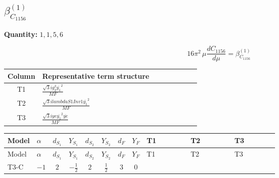 \documentclass[8pt]{article}
\begin{document}
\begin{landscape}
\section*{$\beta_{C_{1156}}^{(1)}$}
\noindent\textbf{Quantity: }$\mathrm{1,1,5,6}$\par\smallskip
\[16\pi^2\,\mu\frac{d C_{1156}}{d\mu}=\beta_{C_{1156}}^{(1)}\]
\begin{center}
\begin{tabular}{@{}c >{\raggedright\arraybackslash}p{0.82\linewidth}@{}}
\toprule
Column & Representative term structure \\
\midrule
T1 & \(\displaystyle \frac{\sqrt{3} i g_{2}^{2} \overline{y_{1}}^{2}}{MF}\) \\
\midrule
T2 & \(\displaystyle \frac{\sqrt{3} i lambdaS1Inv1 \overline{y_{1}}^{2}}{MF}\) \\
\midrule
T3 & \(\displaystyle \frac{\sqrt{3} i ye \overline{y_{1}}^{2} \overline{ye}}{MF}\) \\
\midrule
\bottomrule
\end{tabular}
\end{center}
\smallskip
\tiny
\begin{longtable}{@{}llcccccc >{\raggedright\arraybackslash}p{0.21\linewidth} >{\raggedright\arraybackslash}p{0.21\linewidth} >{\raggedright\arraybackslash}p{0.21\linewidth}@{}}
\toprule
Model & $\alpha$ & $d_{S_1}$ & $Y_{S_1}$ & $d_{S_2}$ & $Y_{S_2}$ & $d_F$ & $Y_F$ & T1 & T2 & T3 \\
\midrule
\endfirsthead
\toprule
Model & $\alpha$ & $d_{S_1}$ & $Y_{S_1}$ & $d_{S_2}$ & $Y_{S_2}$ & $d_F$ & $Y_F$ & T1 & T2 & T3 \\
\midrule
\endhead
T3-C & $-1$ & $2$ & $-\frac{1}{2}$ & $2$ & $\frac{1}{2}$ & $3$ & $0$ & \scriptsize\adjustbox{max width=\linewidth}{$\begin{gathered} \frac{\sqrt{3} i g_{2}^{2} \overline{y_{1}}^{2}}{4 MF}\end{gathered}$} & \scriptsize\adjustbox{max width=\linewidth}{$\begin{gathered} \frac{\sqrt{3} i lambdaS1Inv1 \overline{y_{1}}^{2}}{6 MF}\end{gathered}$} & \scriptsize\adjustbox{max width=\linewidth}{$\begin{gathered} - \frac{\sqrt{3} i ye \overline{y_{1}}^{2} \overline{ye}}{12 MF}\end{gathered}$} \\
\midrule
\bottomrule
\end{longtable}
\clearpage

\end{landscape}
\end{document}
